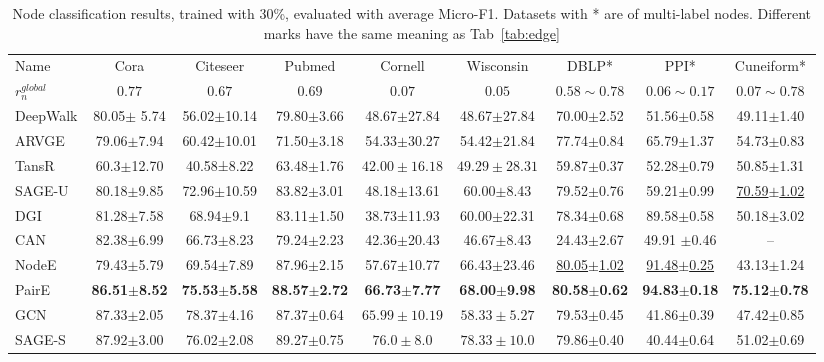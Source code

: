 \documentclass[10pt,journal,compsoc]{IEEEtran}
\begin{document}
  \begin{table*}[!htb]
  \begin{center}
  \caption{Node classification results, trained with 30\%, evaluated with average Micro-F1. Datasets with * are of multi-label nodes. Different marks have the same meaning as Tab~\ref{tab:edge}}
  \label{tab:node}
\renewcommand\arraystretch{1.1}
    \begin{tabular}{p{4.5em}|c|c|c|c|c|c|c|c}
    \hline
    Name&Cora&Citeseer&Pubmed&Cornell&Wisconsin &DBLP*&PPI*&Cuneiform* \\
    $r_n^{global}$ &$0.77$ &$0.67$ &$0.69$ &$0.07$ &$0.05$ &$0.58\sim0.78$ &$0.06\sim0.17$ &$0.07\sim0.78$ \\
\hline
    DeepWalk &80.05$\pm$  5.74&56.02$\pm$10.14 & 79.80$\pm$3.66 & 48.67$\pm$27.84 & 48.67$\pm$27.84 & 70.00$\pm$2.52 & 51.56$\pm$0.58 &49.11$\pm$1.40 \\
    ARVGE& 79.06$\pm$7.94 & 60.42$\pm$10.01 & 71.50$\pm$3.18 & 54.33$\pm$30.27 & 54.42$\pm$21.84 & 77.74$\pm$0.84 & 65.79$\pm$1.37 & 54.73$\pm$0.83 \\
    TansR&60.3$\pm$12.70 &40.58±8.22 &63.48$\pm$1.76  & $42.00\pm16.18$ &$49.29\pm28.31$ & 59.87$\pm$0.37  & 52.28$\pm$0.79 & 50.85$\pm$1.31 \\
    SAGE-U&80.18$\pm$9.85 &72.96$\pm$10.59 &83.82$\pm$3.01 & 48.18$\pm$13.61 & 60.00$\pm$8.43 & 79.52$\pm$0.76 & 59.21$\pm$0.99 & \underline{70.59$\pm$1.02} \\
    DGI&81.28$\pm$7.58 &68.94$\pm$9.1 & 83.11$\pm$1.50 & 38.73±11.93 & 60.00$\pm$22.31 & 78.34$\pm$0.68 & 89.58$\pm$0.58 & 50.18$\pm$3.02 \\
    
    CAN&82.38$\pm$6.99 &66.73$\pm$8.23 &79.24$\pm$2.23 &42.36$\pm$20.43 & 46.67$\pm$8.43 & 24.43$\pm$2.67 & 49.91 $\pm$0.46 & --\\
    NodeE&79.43$\pm$5.79 &69.54$\pm$7.89 & 87.96$\pm$2.15 & 57.67$\pm$10.77 & 66.43$\pm$23.46 & \underline{80.05$\pm$1.02} & \underline{91.48$\pm$0.25} & 43.13$\pm$1.24 \\
    PairE&\textbf{86.51$\pm$8.52} &\textbf{75.53$\pm$5.58} &\textbf{88.57$\pm$2.72} & \textbf{66.73$\pm$7.77} & \textbf{68.00}$\pm$\textbf{9.98} & \colorbox{mygray}{\textbf{80.58}$\pm$\textbf{0.62}} &\colorbox{mygray}{\textbf{94.83}$\pm$\textbf{0.18}} & \colorbox{mygray}{\textbf{75.12}$\pm$\textbf{0.78}} \\
    \hline
    GCN& 87.33$\pm$2.05 & \colorbox{mygray}{78.37$\pm$4.16} & 87.37$\pm$0.64 &$65.99\pm10.19$ & $58.33\pm5.27$ & 79.53$\pm$0.45 & 41.86$\pm$0.39 & 47.42$\pm$0.85 \\
    SAGE-S& \colorbox{mygray}{87.92$\pm$3.00} & 76.02$\pm$2.08	& \colorbox{mygray}{89.27$\pm$0.75}	& \colorbox{mygray}{$76.0\pm8.0$} & $78.33\pm10.0$ & 79.86$\pm$0.40 & 40.44$\pm$0.64	& 51.02$\pm$0.69\\
    

\end{tabular}
\end{center}
\end{table*}
\end{document}
